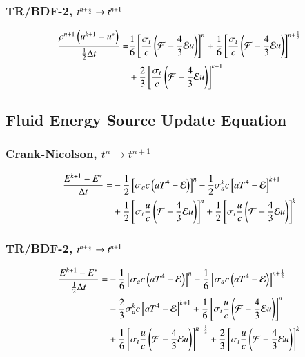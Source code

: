 \documentclass[preprint,12pt]{elsarticle}
\begin{document}
\subsubsection{TR/BDF-2, $t^{n+\frac{1}{2}}\rightarrow t^{n+1}$}
\begin{equation}\begin{split}
  \frac{\rho^{n+1}\left(u^{k+1}-u^*\right)}{\frac{1}{2}\Delta t} =  
  & \frac{1}{6}\left[\frac{\sigma_{t}}{c}\left(\mathcal{F}-\frac{4}{3}\mathcal{E} u\right)\right]^n
   +\frac{1}{6}\left[\frac{\sigma_{t}}{c}\left(\mathcal{F}-\frac{4}{3}\mathcal{E} u\right)\right]^{n+\frac{1}{2}}\\
  &+\frac{2}{3}\left[\frac{\sigma_{t}}{c}\left(\mathcal{F}-\frac{4}{3}\mathcal{E} u\right)\right]^{k+1}
\end{split}\end{equation}

\subsection{Fluid Energy Source Update Equation}
\subsubsection{Crank-Nicolson, $t^n\rightarrow t^{n+1}$}
\begin{equation}\begin{split}
  \frac{E^{k+1}-E^*}{\Delta t} = &
  -\frac{1}{2}\left[\sigma_{a} c\left(aT^4 - \mathcal{E}\right)\right]^n
  -\frac{1}{2}\sigma_{a}^k c\left[aT^4 - \mathcal{E}\right]^{k+1}\\
  &+\frac{1}{2}\left[\sigma_{t}\frac{u}{c}\left(\mathcal{F}-\frac{4}{3}\mathcal{E} u\right)\right]^n
   +\frac{1}{2}\left[\sigma_t\frac{u}{c}\left(\mathcal{F}-\frac{4}{3}\mathcal{E} u\right)\right]^k
\end{split}\end{equation}

\subsubsection{TR/BDF-2, $t^{n+\frac{1}{2}}\rightarrow t^{n+1}$}
\begin{equation}\begin{split}
  \frac{E^{k+1}-E^*}{\frac{1}{2}\Delta t} = &
  -\frac{1}{6}\left[\sigma_a c\left(aT^4 - \mathcal{E}\right)\right]^n
  -\frac{1}{6}\left[\sigma_a c\left(aT^4 - \mathcal{E}\right)\right]^{n+\frac{1}{2}}\\
  &-\frac{2}{3}\sigma_a^k c\left[aT^4 - \mathcal{E}\right]^{k+1}
   +\frac{1}{6}\left[\sigma_t\frac{u}{c}\left(\mathcal{F}-\frac{4}{3}\mathcal{E} u\right)\right]^n\\
  &+\frac{1}{6}\left[\sigma_t\frac{u}{c}\left(\mathcal{F}-\frac{4}{3}\mathcal{E} u\right)\right]^{n+\frac{1}{2}}
   +\frac{2}{3}\left[\sigma_t\frac{u}{c}\left(\mathcal{F}-\frac{4}{3}\mathcal{E} u\right)\right]^k
\end{split}\end{equation}
\end{document}
